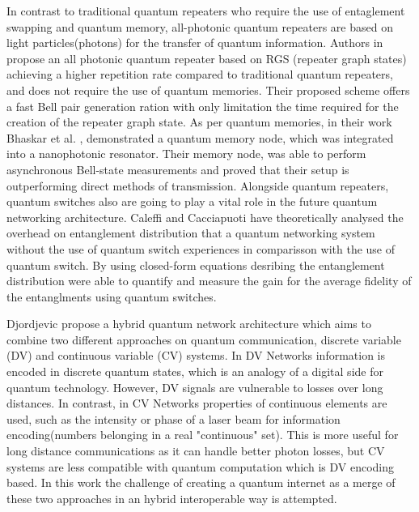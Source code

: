 \documentclass[12pt]{ieeetj}
\begin{document}
		In contrast to traditional quantum repeaters who require the use of entaglement swapping and quantum memory, all-photonic quantum repeaters
		are based on light particles(photons) for the transfer of quantum information.
		Authors in \cite{repeater1} propose an all photonic quantum repeater 
		based on RGS (repeater graph states) achieving a higher repetition rate compared to traditional quantum repeaters, and does not require 
		the use of quantum memories. Their proposed scheme offers a fast Bell pair generation ration with only
		limitation the time required for the creation of the repeater graph state. 
		As per quantum memories, in their work Bhaskar et al. \cite{memories}, demonstrated a quantum memory node, which
		was integrated into a nanophotonic resonator. Their memory node, was able to perform asynchronous Bell-state measurements
		and proved that their setup is outperforming direct methods of transmission. Alongside quantum repeaters, quantum switches also
		are going to play a vital role in the future quantum networking architecture. Caleffi and Cacciapuoti \cite{quantum-switch1}
		have theoretically analysed the overhead on entanglement distribution that a quantum networking system 
		without the use of quantum switch experiences in comparisson with the use of quantum switch. By using closed-form equations
		desribing the entanglement distribution were able to quantify and measure the gain for the average fidelity of the entanglments
		using quantum switches.
	
	

		Djordjevic\cite{cvdv} propose a hybrid quantum network architecture which aims to combine two different approaches
		on quantum communication, discrete variable (DV) and continuous variable (CV) systems. 
		In DV Networks information is encoded in discrete quantum states, which is an analogy of a digital side for quantum technology.
		However, DV signals are vulnerable to losses over long distances. In contrast, in CV Networks properties of continuous elements are used,
		such as the intensity or phase of a laser beam for information encoding(numbers belonging in a real "continuous" set). 
		This is more useful for long distance communications as it can handle better photon losses, but CV systems are less compatible with quantum computation
		which is DV encoding based. In this work the challenge of creating a quantum internet as a merge of these two approaches in an
		hybrid interoperable way is attempted.
\end{document}

